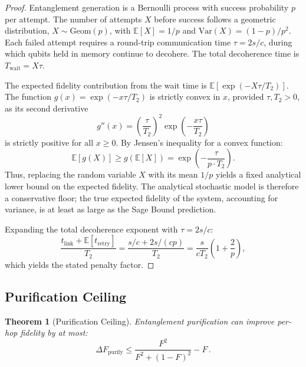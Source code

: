 \documentclass[aps,pra,reprint,amsmath,amssymb,superscriptaddress]{revtex4-2}
\newtheorem{theorem}{Theorem}
\begin{document}
\begin{proof}
Entanglement generation is a Bernoulli process with success probability $p$ per attempt. The number of attempts $X$ before success follows a geometric distribution, $X \sim \text{Geom}(p)$, with $\mathbb{E}[X] = 1/p$ and $\text{Var}(X) = (1-p)/p^2$. Each failed attempt requires a round-trip communication time $\tau = 2s/c$, during which qubits held in memory continue to decohere. The total decoherence time is $T_{\text{wait}} = X\tau$.

The expected fidelity contribution from the wait time is $\mathbb{E}[\exp(-X\tau/T_2)]$. The function $g(x) = \exp(-x\tau/T_2)$ is strictly convex in $x$, provided $\tau, T_2 > 0$, as its second derivative
\begin{equation}
g''(x) = \left(\frac{\tau}{T_2}\right)^2 \exp\!\left(-\frac{x\tau}{T_2}\right) 
\end{equation}
is strictly positive for all $x \geq 0$. By Jensen's inequality for a convex function:
\begin{equation}
\mathbb{E}[g(X)] \geq g(\mathbb{E}[X]) = \exp\!\left(-\frac{\tau}{p \cdot T_2}\right).
\end{equation}
Thus, replacing the random variable $X$ with its mean $1/p$ yields a fixed analytical lower bound on the expected fidelity. The analytical stochastic model is therefore a conservative floor; the true expected fidelity of the system, accounting for variance, is at least as large as the Sage Bound prediction.

Expanding the total decoherence exponent with $\tau = 2s/c$:
\begin{equation}
\frac{t_{\text{link}} + \mathbb{E}[t_{\text{retry}}]}{T_2} = \frac{s/c + 2s/(cp)}{T_2} = \frac{s}{cT_2}\left(1 + \frac{2}{p}\right),
\end{equation}
which yields the stated penalty factor.
\end{proof}

\subsection{Purification Ceiling}

\begin{theorem}[Purification Ceiling]
\label{thm:purification}
Entanglement purification can improve per-hop fidelity by at most:
\begin{equation}
\Delta F_{\text{purify}} \leq \frac{F^2}{F^2 + (1-F)^2} - F \,.
\end{equation}
\end{theorem}
\end{document}
